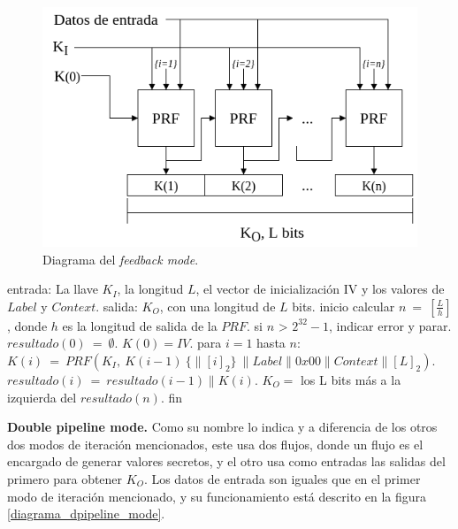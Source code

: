 \begin{figure}[H]
  \begin{center}
    \includegraphics[width=0.75\linewidth]{diagramas/feedback_mode}
    \caption{Diagrama del \textit{feedback mode}.}
    \label{diagrama_feedback_mode}
   \end{center}
\end{figure}

\begin{pseudocodigo}[caption={Funcionamiento del \textit{feedback mode}.}, 
label={mi:2}]
  entrada:   La llave $K_I$, la longitud $L$, el vector de inicialización IV 
             y los valores de $Label$ y $Context$.
  salida:    $K_O$, con una longitud de $L$ bits.
  inicio
    calcular $n\: =\: [\frac{L}{h}]$, donde $h$ es la longitud de salida de la $PRF$.
    si $n$ > $2^{32}-1$, indicar error y parar.
    $resultado(0)\: =\: \emptyset$.
    $K(0) = IV$.
    para $i=1$ hasta $n$:
      $K(i)\: = \:PRF(K_I,\: K(i-1)\: \{\parallel {[i]}_2\}\: \parallel Label \parallel 0x00 \parallel Context \parallel {[L]}_2 )$.
      $resultado(i)\: =\: resultado(i-1) \parallel K(i)$.
    $K_O =$ los L bits más a la izquierda del $resultado(n)$. 
  fin
\end{pseudocodigo}

\textbf{Double pipeline mode.}
Como su nombre lo indica y a diferencia de los otros dos modos de iteración 
mencionados, este usa dos flujos, donde un flujo es el encargado de generar 
valores secretos, y el otro usa como entradas las salidas del primero para 
obtener $K_O$. Los datos de entrada son iguales que en el primer modo de 
iteración mencionado, y su funcionamiento está descrito en la figura 
\ref{diagrama_dpipeline_mode}.

